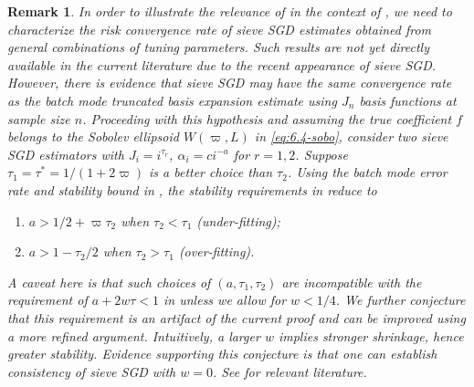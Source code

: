 \documentclass[11pt]{article}
\theoremstyle{plain}
\newtheorem{remark}[theorem]{Remark}
\begin{document}
\begin{remark}
    \label{rem:6.4-implication}
In order to illustrate the relevance of  in the context of , we need to characterize the risk convergence rate of sieve SGD estimates obtained from general combinations of tuning parameters.  Such results are not yet directly available in the current literature due to the recent appearance of sieve SGD.  However, there is evidence that sieve SGD may have the same convergence rate as the batch mode truncated basis expansion estimate using $J_n$ basis functions at sample size $n$.  Proceeding with this hypothesis and assuming the true coefficient $f$ belongs to the Sobolev ellipsoid $W(\varpi,L)$ in \eqref{eq:6.4-sobo}, consider two sieve SGD estimators with $J_i = i^{\tau_r}$, $\alpha_i = c i^{-a}$ for $r=1,2$. Suppose $\tau_1=\tau^*=1/(1+2\varpi)$ is a better choice than $\tau_2$.  Using the batch mode error rate and stability bound in , the stability requirements in  reduce to
\begin{enumerate}
    \item $a>1/2+\varpi\tau_2$ when $\tau_2<\tau_1$ (under-fitting);
    \item $a>1-\tau_2/2$ when $\tau_2>\tau_1$ (over-fitting).
\end{enumerate}
A caveat here is that such choices of $(a, \tau_1, \tau_2)$ are incompatible with the requirement of $a+2w\tau <1$ in  unless we allow for $w<1/4$.   We further conjecture that this requirement is an artifact of the current proof and can be improved using a more refined argument.  Intuitively, a larger $w$ implies stronger shrinkage, hence greater stability.  Evidence supporting this conjecture is that one can establish consistency of sieve SGD with $w=0$. See  for relevant literature.
\end{remark}






\end{document}
